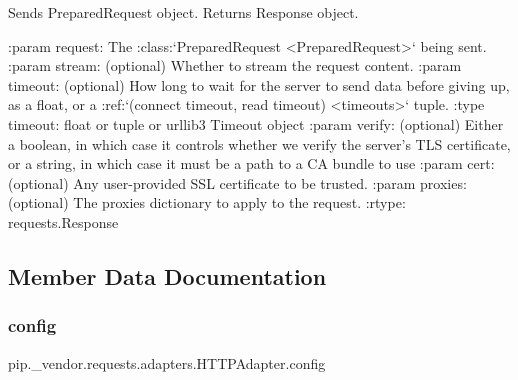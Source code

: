 \begin{DoxyVerb}Sends PreparedRequest object. Returns Response object.

:param request: The :class:`PreparedRequest <PreparedRequest>` being sent.
:param stream: (optional) Whether to stream the request content.
:param timeout: (optional) How long to wait for the server to send
    data before giving up, as a float, or a :ref:`(connect timeout,
    read timeout) <timeouts>` tuple.
:type timeout: float or tuple or urllib3 Timeout object
:param verify: (optional) Either a boolean, in which case it controls whether
    we verify the server's TLS certificate, or a string, in which case it
    must be a path to a CA bundle to use
:param cert: (optional) Any user-provided SSL certificate to be trusted.
:param proxies: (optional) The proxies dictionary to apply to the request.
:rtype: requests.Response
\end{DoxyVerb}
 

\subsection{Member Data Documentation}
\mbox{\label{classpip_1_1__vendor_1_1requests_1_1adapters_1_1HTTPAdapter_afdfc57f02baf1870912e8da649f99415}} 
\subsubsection{\texorpdfstring{config}{config}}
{\footnotesize\ttfamily pip.\+\_\+vendor.\+requests.\+adapters.\+H\+T\+T\+P\+Adapter.\+config}

\mbox{\label{classpip_1_1__vendor_1_1requests_1_1adapters_1_1HTTPAdapter_a1890f4528c843662658f580eb7f541cd}} 
